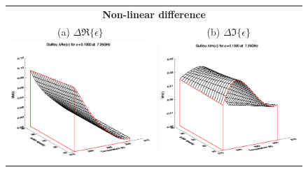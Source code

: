 \begin{figure}[htp]
  \centering
  \begin{tabular}{c c}
    \multicolumn{2}{c}{\sffamily\textbf{Non-linear difference}}\\
    \textsf{(a)} $\Delta\Re\{\epsilon\}$ &
    \textsf{(b)} $\Delta\Im\{\epsilon\}$ \\
    \hspace{1.0em}\includegraphics[bb=125 240 508 540,clip,scale=0.5]{graphics/Guillou/FWDTL/FWDde_a0.1000_re_7.25GHz.eps} &
    \includegraphics[bb=125 240 508 540,clip,scale=0.5]{graphics/Guillou/FWDTL/FWDde_a0.1000_im_7.25GHz.eps} \\\\

\end{tabular}
\end{figure}
